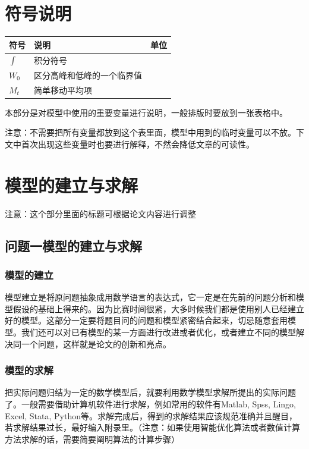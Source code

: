 \section{符号说明}
\begin{table}[h]
	\centering
	\begin{tabular}{p{2.0cm}<{\centering}p{9.0cm}<{\centering}p{2.0cm}<{\centering}}
		\hline
		符号 & 说明 & 单位 \\ %
		\hline
		$\int$ & 积分符号 &  \\ %
		$W_0$ & 区分高峰和低峰的一个临界值 &  \\ %
		$M_t$ &  简单移动平均项 &  \\ %
		\hline
	\end{tabular}
\end{table}
本部分是对模型中使用的重要变量进行说明，一般排版时要放到一张表格中。

注意：不需要把所有变量都放到这个表里面，模型中用到的临时变量可以不放。下文中首次出现这些变量时也要进行解释，不然会降低文章的可读性。

\section{模型的建立与求解}

注意：这个部分里面的标题可根据论文内容进行调整

\subsection{问题一模型的建立与求解}
\subsubsection{模型的建立}
模型建立是将原问题抽象成用数学语言的表达式，它一定是在先前的问题分析和模型假设的基础上得来的。因为比赛时间很紧，大多时候我们都是使用别人已经建立好的模型。这部分一定要将题目问的问题和模型紧密结合起来，切忌随意套用模型。我们还可以对已有模型的某一方面进行改进或者优化，或者建立不同的模型解决同一个问题，这样就是论文的创新和亮点。
\subsubsection{模型的求解}
把实际问题归结为一定的数学模型后，就要利用数学模型求解所提出的实际问题了。一般需要借助计算机软件进行求解，例如常用的软件有Matlab, Spss, Lingo, Excel, Stata, Python等。求解完成后，得到的求解结果应该规范准确并且醒目，若求解结果过长，最好编入附录里。（注意：如果使用智能优化算法或者数值计算方法求解的话，需要简要阐明算法的计算步骤）
